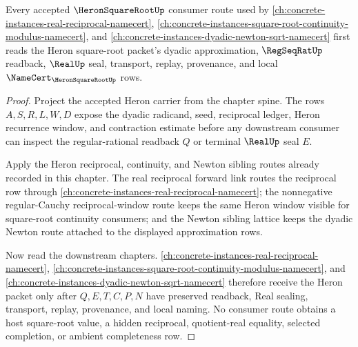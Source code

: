 \begin{theorem}
\label{thm:heron-square-root-sibling-consumer-lattice}
Every accepted $\HeronSquareRootUp$ consumer route used by \autoref{ch:concrete-instances-real-reciprocal-namecert}, \autoref{ch:concrete-instances-square-root-continuity-modulus-namecert}, and \autoref{ch:concrete-instances-dyadic-newton-sqrt-namecert} first reads the Heron square-root packet's dyadic approximation, $\RegSeqRatUp$ readback, $\RealUp$ seal, transport, replay, provenance, and local $\NameCert_{\HeronSquareRootUp}$ rows.
\end{theorem}
\begin{proof}
Project the accepted Heron carrier from the chapter spine. The rows $A,S,R,L,W,D$ expose the dyadic radicand, seed, reciprocal ledger, Heron recurrence window, and contraction estimate before any downstream consumer can inspect the regular-rational readback $Q$ or terminal $\RealUp$ seal $E$.

Apply the Heron reciprocal, continuity, and Newton sibling routes already recorded in this chapter. The real reciprocal forward link routes the reciprocal row through \autoref{ch:concrete-instances-real-reciprocal-namecert}; the nonnegative regular-Cauchy reciprocal-window route keeps the same Heron window visible for square-root continuity consumers; and the Newton sibling lattice keeps the dyadic Newton route attached to the displayed approximation rows.

Now read the downstream chapters. \autoref{ch:concrete-instances-real-reciprocal-namecert}, \autoref{ch:concrete-instances-square-root-continuity-modulus-namecert}, and \autoref{ch:concrete-instances-dyadic-newton-sqrt-namecert} therefore receive the Heron packet only after $Q,E,T,C,P,N$ have preserved readback, Real sealing, transport, replay, provenance, and local naming. No consumer route obtains a host square-root value, a hidden reciprocal, quotient-real equality, selected completion, or ambient completeness row.
\end{proof}
